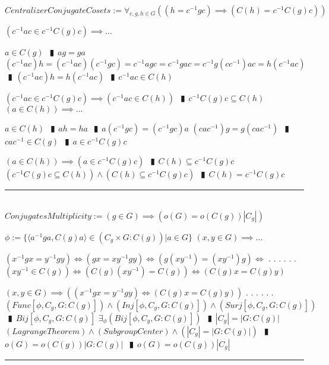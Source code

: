 \documentclass{book}
\newcommand{\abr}{:=}
\newcommand{\cont}{\phantom{.}. . .\phantom{.}}
\newcommand{\pipe}{$\phantom{(}\vrectangleblack\phantom{)}$}
\newcommand{\pr}[1]{\left(#1\right)}
\begin{document}
$CentralizerConjugateCosets \abr \forall_{c, g, h \in G}\pr{(h = c^{-1} g c) \implies \pr{C(h) = c^{-1} C(g) c}}$
\begin{enumerate}
  \lit $\pr{c^{-1} a c \in c^{-1} C(g) c} \implies \ldots$
  \begin{enumerate}
    \lit $a \in C(g)$ \pipe $a g = g a$
    \lit $(c^{-1} a c) h = (c^{-1} a c) (c^{-1} g c) = c^{-1} a g c = c^{-1} g a c = c^{-1} g (c c^{-1}) a c = h (c^{-1} a c)$ \pipe $(c^{-1} a c) h = h (c^{-1} a c)$ \pipe $c^{-1} a c \in C(h)$
  \end{enumerate}
  \lit $\pr{c^{-1} a c \in c^{-1} C(g) c} \implies \pr{c^{-1} a c \in C(h)}$ \pipe $c^{-1} C(g) c \subseteq C(h)$
  \lit $\pr{a \in C(h)} \implies \ldots$
  \begin{enumerate}
    \lit $a \in C(h)$ \pipe $a h = h a$ \pipe $a (c^{-1} g c) = (c^{-1} g c) a$
    \lit $(c a c^{-1}) g = g (c a c^{-1})$ \pipe $c a c^{-1} \in C(g)$ \pipe $a \in c^{-1} C(g) c$
  \end{enumerate}
  \lit $\pr{a \in C(h)} \implies \pr{a \in c^{-1} C(g) c}$ \pipe $C(h) \subseteq c^{-1} C(g) c$
  \lit $\pr{c^{-1} C(g) c \subseteq C(h)} \land \pr{C(h) \subseteq c^{-1} C(g) c}$ \pipe $C(h) = c^{-1} C(g) c$
\end{enumerate} \vspace{.75mm} \hrule \vspace{.75mm} \ \\ 

$ConjugatesMultiplicity \abr (g \in G) \implies \pr{o(G) = o\pr{C(g)} |C_g|}$
\begin{enumerate}
  \lit $\phi \abr \{\langle a^{-1} g a, C(g) a \rangle \in \pr{C_g \times G : C(g)} | a \in G\}$
  \lit $(x, y \in G) \implies \ldots$
  \begin{enumerate}
    \lit $(x^{-1} g x = y^{-1} g y) \iff (g x = x y^{-1} g y) \iff \pr{g (x y^{-1}) = (x y^{-1}) g} \iff$ \cont
    \lit \cont $\pr{x y^{-1} \in C(g)} \iff \pr{C(g) (x y^{-1}) = C(g)} \iff \pr{C(g) x = C(g) y}$
  \end{enumerate}
  \lit $(x, y \in G) \implies \pr{(x^{-1} g x = y^{-1} g y) \iff \pr{C(g) x = C(g) y}}$ \cont
  \lit \cont $\pr{Func[\phi, C_g, G : C(g)]} \land \pr{Inj[\phi, C_g, G : C(g)]} \land \pr{Surj[\phi, C_g, G : C(g)]}$ \pipe $Bij[\phi, C_g, G : C(g)]$ %
  \lit $\exists_{\phi}\pr{Bij[\phi, C_g, G : C(g)]}$ \pipe $|C_g| = |G : C(g)|$
  \lit $(LagrangeTheorem) \land (SubgroupCenter) \land \pr{|C_g| = |G : C(g)|}$ \pipe $o(G) = o\pr{C(g)} |G : C(g)|$ \pipe $o(G) = o\pr{C(g)} |C_g|$ 
\end{enumerate} \vspace{.75mm} \hrule \vspace{.75mm} \ \\ 
\end{document}
